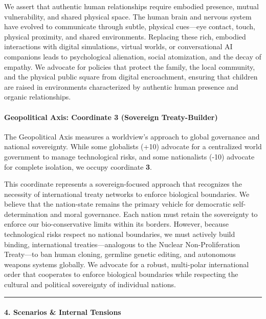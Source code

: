 We assert that authentic human relationships require embodied presence,
mutual vulnerability, and shared physical space. The human brain and
nervous system have evolved to communicate through subtle, physical
cues---eye contact, touch, physical proximity, and shared environments.
Replacing these rich, embodied interactions with digital simulations,
virtual worlds, or conversational AI companions leads to psychological
alienation, social atomization, and the decay of empathy. We advocate
for policies that protect the family, the local community, and the
physical public square from digital encroachment, ensuring that children
are raised in environments characterized by authentic human presence and
organic relationships.

\paragraph{Geopolitical Axis: Coordinate 3 (Sovereign
Treaty-Builder)}\label{geopolitical-axis-coordinate-3-sovereign-treaty-builder}

The Geopolitical Axis measures a worldview's approach to global
governance and national sovereignty. While some globalists (+10)
advocate for a centralized world government to manage technological
risks, and some nationalists (-10) advocate for complete isolation, we
occupy coordinate \textbf{3}.

This coordinate represents a sovereign-focused approach that recognizes
the necessity of international treaty networks to enforce biological
boundaries. We believe that the nation-state remains the primary vehicle
for democratic self-determination and moral governance. Each nation must
retain the sovereignty to enforce our bio-conservative limits within its
borders. However, because technological risks respect no national
boundaries, we must actively build binding, international
treaties---analogous to the Nuclear Non-Proliferation Treaty---to ban
human cloning, germline genetic editing, and autonomous weapons systems
globally. We advocate for a robust, multi-polar international order that
cooperates to enforce biological boundaries while respecting the
cultural and political sovereignty of individual nations.

\begin{center}\rule{0.5\linewidth}{0.5pt}\end{center}

\paragraph{4. Scenarios \& Internal
Tensions}\label{scenarios-internal-tensions-33}

